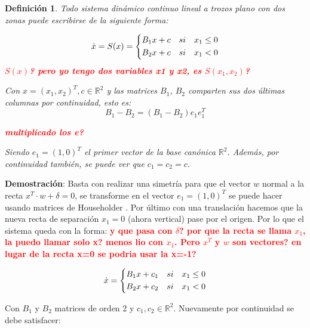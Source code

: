 \documentclass[12pt,a4paper]{report} %
\newtheorem{definicion}{Definición}[chapter] %
\begin{document}
	\begin{definicion}
		Todo sistema dinámico continuo lineal a trozos plano con dos zonas puede escribirse de la siguiente forma:
	
	\begin{equation}
		\dot{x}=S(x)=
		\label{eq:lien}
		\scalebox{1}{$\displaystyle
			\left\{
			\begin{aligned}
				B_1x+c\quad si \quad x_1 \leq 0 \\
				B_2x+c\quad si \quad x_1 < 0
			\end{aligned}
			\right.
			$}
	\end{equation}\smallskip
	\textbf{\textcolor{red}{$S(x)$? pero yo tengo dos variables x1 y x2, es $S(x_1,x_2)$? }}
	
	Con $x=(x_1,x_2)^T, c\in \mathbb{R}^2$ y las matrices $B_1$, $B_2$ comparten sus dos últimas columnas por continuidad, esto es:
	\begin{equation}
		B_1-B_2 = \left(B_1-B_2\right)e_1e_1^T 
	\end{equation}\smallskip
	
	\textbf{\textcolor{red}{multiplicado los e?}}
	
	Siendo $e_1=(1,0)^T$ el primer vector de la base canónica $\mathbb{R}^2$. Además, por continuidad también, se puede ver que $c_1=c_2=c$.
    \end{definicion}\smallskip

	
	\textbf{Demostración}: Basta con realizar una simetría para que el vector $w$ normal a la recta $x^T\cdotp w+\delta=0$, se transforme en el vector $e_1=(1,0)^T$ se puede hacer usando matrices de Householder \cite{docvic}. Por último con una translación hacemos que la nueva recta de separación $x_1=0$ (ahora vertical) pase por el origen. Por lo que el sistema queda con la forma:
	\textbf{\textcolor{red}{y que pasa con $\delta$? por que la recta se llama $x_1$, la puedo llamar solo x? menos lio con $\dot{x}_1$. Pero $x^T$ y $w$ son vectores? en lugar de la recta x=0 se podria usar la x=-1?}}
	
	\begin{equation}
		\dot{x}=
		\label{eq:lien2}
		\scalebox{1}{$\displaystyle
			\left\{
			\begin{aligned}
			B_1x+c_1\quad si \quad x_1 \leq 0 \\
			B_2x+c_2\quad si \quad x_1 < 0
			\end{aligned}
			\right.
			$}
	\end{equation}\smallskip
	
	Con $B_1$ y $B_2$ matrices de orden 2 y $c_1, c_2 \in \mathbb{R}^2$. Nuevamente por continuidad se debe satisfacer:
	
\end{document}
